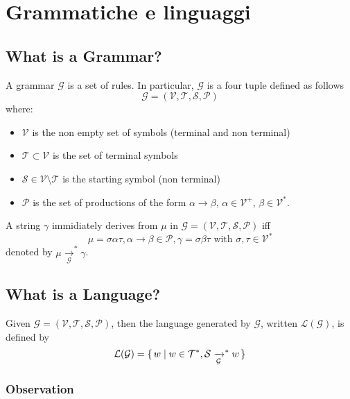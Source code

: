 \chapter{Grammatiche e linguaggi}

\section{What is a Grammar?}

A grammar $\mathcal{G}$ is a set of rules. In particular, $\mathcal{G}$ is a four tuple defined as follows
\begin{equation}
\mathcal{G} = (\mathcal{V}, \mathcal{T}, \mathcal{S}, \mathcal{P})
\end{equation}
where:
\begin{itemize}
\item $\mathcal{V}$ is the non empty set of symbols (terminal and non terminal)
\item $\mathcal{T} \subset \mathcal{V}$ is the set of terminal symbols
\item $\mathcal{S} \in \mathcal{V} \setminus \mathcal{T}$ is the starting symbol (non terminal)
\item $\mathcal{P}$ is the set of productions of the form $\alpha \rightarrow \beta$, $\alpha \in \mathcal{V}^+$, $\beta \in \mathcal{V}^*$.
\end{itemize}
\noindent
A string $\gamma$ immidiately derives from $\mu$ in $\mathcal{G} = (\mathcal{V}, \mathcal{T}, \mathcal{S}, \mathcal{P})$ iff
\begin{equation}
\mu = \sigma \alpha \tau, \alpha \rightarrow \beta \in \mathcal{P}, \gamma = \sigma \beta \tau \text{ with } \sigma,\tau \in \mathcal{V}^*
\end{equation}
denoted by $\mu \xrightarrow[\mathcal{G}]{}^* \gamma$.


\section{What is a Language?}
Given $\mathcal{G} = (\mathcal{V}, \mathcal{T}, \mathcal{S}, \mathcal{P})$, then the language generated by $\mathcal{G}$, written $\mathcal{L(G)}$, is defined by
\[
\mathcal{L(G)} = \set{ w | w \in \mathcal{T}^*, \mathcal{S} \xrightarrow[\mathcal{G}]{}^* w }
\]


\subsection{Observation}

